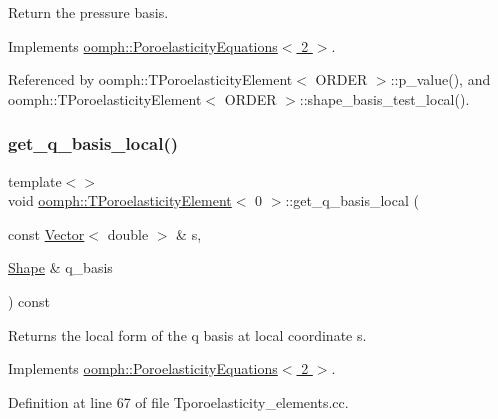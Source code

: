 Return the pressure basis. 



Implements \hyperlink{classoomph_1_1PoroelasticityEquations_af5dd9aa31ee8da161285e7ed6b7cb8fc}{oomph\+::\+Poroelasticity\+Equations$<$ 2 $>$}.



Referenced by oomph\+::\+T\+Poroelasticity\+Element$<$ O\+R\+D\+E\+R $>$\+::p\+\_\+value(), and oomph\+::\+T\+Poroelasticity\+Element$<$ O\+R\+D\+E\+R $>$\+::shape\+\_\+basis\+\_\+test\+\_\+local().

\mbox{\label{classoomph_1_1TPoroelasticityElement_aeda8ff5b06e401e02516365f2e43003b}} 
\subsubsection{\texorpdfstring{get\+\_\+q\+\_\+basis\+\_\+local()}{get\_q\_basis\_local()}\hspace{0.1cm}{\footnotesize\ttfamily [1/3]}}
{\footnotesize\ttfamily template$<$$>$ \\
void \hyperlink{classoomph_1_1TPoroelasticityElement}{oomph\+::\+T\+Poroelasticity\+Element}$<$ 0 $>$\+::get\+\_\+q\+\_\+basis\+\_\+local (\begin{DoxyParamCaption}\item[{const \hyperlink{classoomph_1_1Vector}{Vector}$<$ double $>$ \&}]{s,  }\item[{\hyperlink{classoomph_1_1Shape}{Shape} \&}]{q\+\_\+basis }\end{DoxyParamCaption}) const\hspace{0.3cm}{\ttfamily [virtual]}}



Returns the local form of the q basis at local coordinate s. 



Implements \hyperlink{classoomph_1_1PoroelasticityEquations_ab1784901ec76efaefc0a4b3f12cd9078}{oomph\+::\+Poroelasticity\+Equations$<$ 2 $>$}.



Definition at line 67 of file Tporoelasticity\+\_\+elements.\+cc.



